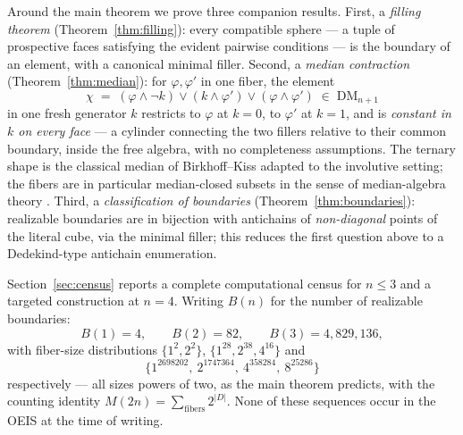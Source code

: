 \documentclass[11pt]{amsart}
\theoremstyle{definition}
\newcommand{\DM}{\mathrm{DM}}
\begin{document}
Around the main theorem we prove three companion results.
First, a \emph{filling theorem} (Theorem~\ref{thm:filling}): every
compatible sphere --- a tuple of prospective faces satisfying the
evident pairwise conditions --- is the boundary of an element, with a
canonical minimal filler.  Second, a \emph{median contraction}
(Theorem~\ref{thm:median}): for $\varphi, \varphi'$ in one fiber, the
element
\[
  \chi \;=\; (\varphi \wedge \neg k) \vee (k \wedge \varphi') \vee
  (\varphi \wedge \varphi') \;\in\; \DM_{n+1}
\]
in one fresh generator $k$ restricts to $\varphi$ at $k = 0$, to
$\varphi'$ at $k = 1$, and is \emph{constant in $k$ on every face}
--- a cylinder connecting the two fillers relative to their common
boundary, inside the free algebra, with no completeness assumptions.
The ternary shape is the classical median of Birkhoff--Kiss
\cite{BirkhoffKiss} adapted to the involutive setting; the fibers are
in particular median-closed subsets in the sense of median-algebra
theory \cite{BandeltHedlikova}.  Third, a \emph{classification of
boundaries} (Theorem~\ref{thm:boundaries}): realizable boundaries are
in bijection with antichains of \emph{non-diagonal} points of the
literal cube, via the minimal filler; this reduces the first question
above to a Dedekind-type antichain enumeration.

Section~\ref{sec:census} reports a complete computational census for
$n \le 3$ and a targeted construction at $n = 4$.  Writing $B(n)$ for
the number of realizable boundaries:
\[
  B(1) = 4, \qquad B(2) = 82, \qquad B(3) = 4{,}829{,}136,
\]
with fiber-size distributions $\{1^2, 2^2\}$,
$\{1^{28}, 2^{38}, 4^{16}\}$ and
\[
  \{1^{2698202},\ 2^{1747364},\ 4^{358284},\ 8^{25286}\}
\]
respectively --- all sizes powers of two, as the main theorem
predicts, with the counting identity
$M(2n) = \sum_{\text{fibers}} 2^{|D|}$.  None of these sequences
occur in the OEIS at the time of writing.
\end{document}
